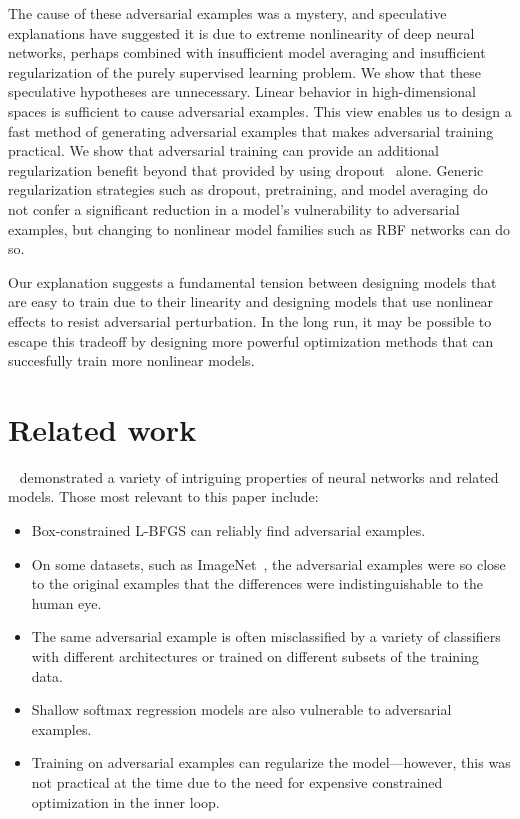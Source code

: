 \documentclass{article} %
\begin{document}
The cause of these adversarial examples was a mystery, and speculative explanations have
suggested it is due to extreme nonlinearity of deep neural networks, perhaps combined
with insufficient model averaging and insufficient regularization of the purely supervised
learning problem. We show that these speculative hypotheses are unnecessary.
Linear behavior in high-dimensional spaces is sufficient to cause adversarial examples.
This view enables us to design a fast method of generating adversarial examples that
makes adversarial training practical. We show that adversarial training can provide
an additional regularization benefit beyond that provided by using dropout~\citep{dropout} alone.
Generic regularization strategies such as dropout, pretraining,
and model averaging do not confer a significant reduction in a model's vulnerability to
adversarial examples, but changing to nonlinear model families such as RBF networks can do so.

Our explanation suggests a fundamental tension between designing models that are easy to train due
to their linearity and designing models that use nonlinear effects to resist adversarial
perturbation. In the long run, it may be possible to escape this tradeoff by designing more
powerful optimization methods that can succesfully train more nonlinear models.

\section{Related work}

~\citet{Szegedy-ICLR2014} demonstrated a variety of intriguing properties of neural networks
and related models. Those most relevant to this paper include:
\begin{itemize}
\item Box-constrained L-BFGS can reliably find adversarial examples.
\item On some datasets, such as ImageNet~\citep{ImageNet}, the adversarial examples
    were so close to the original examples that the differences were indistinguishable
    to the human eye.
\item The same adversarial example is often misclassified by a variety of 
      classifiers with different architectures or trained on different subsets of the training data.
\item %
      Shallow softmax regression models are also vulnerable to adversarial examples.
\item Training on adversarial examples can regularize the model---however, this was not
      practical at the time due to the need for expensive constrained optimization 
      in the inner loop.
\end{itemize}
\end{document}
